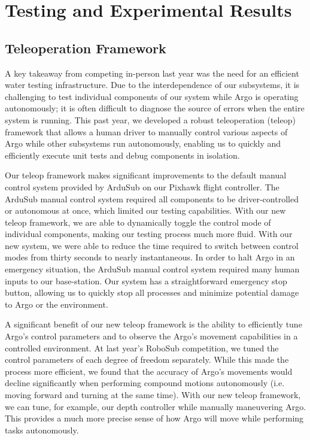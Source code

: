 \documentclass[conference]{IEEEtran}
\begin{document}
\section{Testing and Experimental Results}
\label{sec:testing}

\subsection{Teleoperation Framework}
\label{ssec:teleop}
A key takeaway from competing in-person last year was the need for an efficient water testing infrastructure. Due to the interdependence of our subsystems, it is challenging to test individual components of our system while Argo is operating autonomously; it is often difficult to diagnose the source of errors when the entire system is running. This past year, we developed a robust teleoperation (teleop) framework that allows a human driver to manually control various aspects of Argo while other subsystems run autonomously, enabling us to quickly and efficiently execute unit tests and debug components in isolation.

Our teleop framework makes significant improvements to the default manual control system provided by ArduSub on our Pixhawk flight controller. The ArduSub manual control system required all components to be driver-controlled or autonomous at once, which limited our testing capabilities. With our new teleop framework, we are able to dynamically toggle the control mode of individual components, making our testing process much more fluid. With our new system, we were able to reduce the time required to switch between control modes from thirty seconds to nearly instantaneous. In order to halt Argo in an emergency situation, the ArduSub manual control system required many human inputs to our base-station. Our system has a straightforward emergency stop button, allowing us to quickly stop all processes and minimize potential damage to Argo or the environment.

A significant benefit of our new teleop framework is the ability to efficiently tune Argo’s control parameters and to observe the Argo’s movement capabilities in a controlled environment. At last year’s RoboSub competition, we tuned the control parameters of each degree of freedom separately. While this made the process more efficient, we found that the accuracy of Argo’s movements would decline significantly when performing compound motions autonomously (i.e. moving forward and turning at the same time). With our new teleop framework, we can tune, for example, our depth controller while manually maneuvering Argo. This provides a much more precise sense of how Argo will move while performing tasks autonomously.
\end{document}
